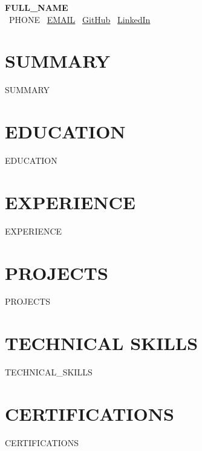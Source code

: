 \documentclass[10pt,letterpaper]{article}
\begin{document}
\begin{center}
{\fontsize{15}{18}\bfseries {{FULL_NAME}}}\\[3pt]
\faPhone\ {{PHONE}} \quad\textbar\quad
\faEnvelope\ \href{mailto:{{EMAIL}}}{{{EMAIL}}} \quad\textbar\quad
\faGithub\ \href{{{GITHUB}}}{GitHub} \quad\textbar\quad
\faLinkedin\ \href{{{LINKEDIN}}}{LinkedIn}
\end{center}

\section*{SUMMARY}
{{SUMMARY}}

\section*{EDUCATION}
{{EDUCATION}}

\section*{EXPERIENCE}
{{EXPERIENCE}}

\section*{PROJECTS}
{{PROJECTS}}

\section*{TECHNICAL SKILLS}
{{TECHNICAL_SKILLS}}

\section*{CERTIFICATIONS}
{{CERTIFICATIONS}}
\end{document}
